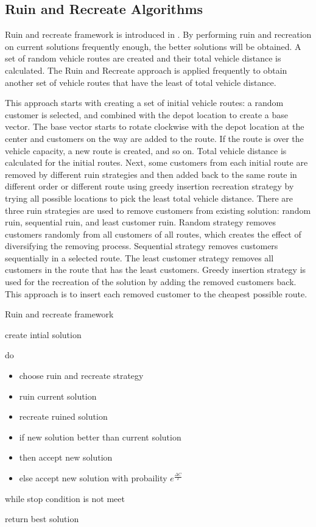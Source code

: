 \documentclass[../main.tex]{}
\begin{document}
\subsection{Ruin and Recreate Algorithms}

Ruin and recreate framework is introduced in \cite{ref:rr_break}. By performing ruin and recreation on current solutions frequently enough, the better solutions will be obtained. A set of random vehicle routes are created and their total vehicle distance is calculated. The Ruin and Recreate approach is applied frequently to obtain another set of vehicle routes that have the least of total vehicle distance.

This approach starts with creating a set of initial vehicle routes: a random customer is selected, and combined with the depot location to create a base vector. The base vector starts to rotate clockwise with the depot location at the center and customers on the way are added to the route. If the route is over the vehicle capacity, a new route is created, and so on. Total vehicle distance is calculated for the initial routes.
Next, some customers from each initial route are removed by different ruin strategies and then added back to the same route in different order or different route using greedy insertion recreation strategy by trying all possible locations to pick the least total vehicle distance.
 There are three ruin strategies are used to remove customers from existing solution: random ruin, sequential ruin, and least customer ruin. Random strategy removes customers randomly from all customers of all routes, which creates the effect of diversifying the removing process. Sequential strategy removes customers sequentially in a selected route. The least customer strategy removes all customers in the route that has the least customers.
Greedy insertion strategy is used for the recreation of the solution by adding the removed customers back. This approach is to insert each removed customer to the cheapest possible route.

\begin{algorithm}
\caption{Ruin and recreate framework}\label{alg:RR}
\flushleft
\begin{itemize}
\item create intial solution
\item do {
\flushleft
\begin{itemize}
\item choose ruin and recreate strategy
\item ruin current solution
\item recreate ruined solution
\item if new solution better than current solution
\item then accept new solution
\item else accept new solution with probaility $e^{\frac{\Delta C}{T}}$
\end{itemize}
\item } while stop condition is not meet
\item return best solution
\end{itemize}
\end{algorithm}
\end{document}
